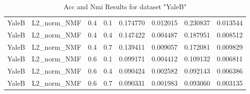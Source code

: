 \begin{table}[p]
\begin{tabular}{cccccccc}
YaleB            & L2\_norm\_NMF         & 0.4        & 0.1        & 0.174770           & 0.012015          & 0.230837           & 0.013544          \\
YaleB            & L2\_norm\_NMF         & 0.4        & 0.4        & 0.147422           & 0.004487          & 0.187951           & 0.008512          \\
YaleB            & L2\_norm\_NMF         & 0.4        & 0.7        & 0.139411           & 0.009057          & 0.172081           & 0.009829          \\
YaleB            & L2\_norm\_NMF         & 0.6        & 0.1        & 0.099171           & 0.004412          & 0.109132           & 0.006811          \\
YaleB            & L2\_norm\_NMF         & 0.6        & 0.4        & 0.090424           & 0.002582          & 0.092143           & 0.006386          \\
YaleB            & L2\_norm\_NMF         & 0.6        & 0.7        & 0.090331           & 0.001983          & 0.093060           & 0.003135         \\\hline
\end{tabular}
\caption{Acc and Nmi Results for dataset "YaleB"}
\label{tab:yaleb}
\end{table}


